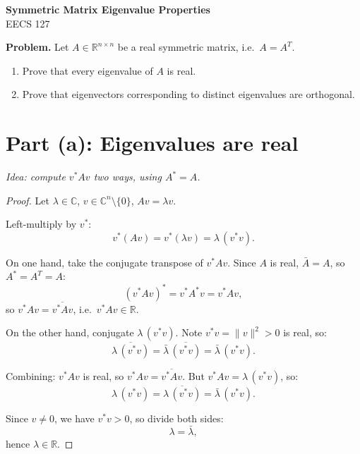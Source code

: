 \documentclass[11pt]{article}
\theoremstyle{definition}
\theoremstyle{plain}
\theoremstyle{remark}
\begin{document}
\begin{center}
  {\Huge \textbf{Symmetric Matrix Eigenvalue Properties}} \\[12pt]
  {\Large EECS 127} \\[24pt]
\end{center}

\vspace{10pt}

\begin{axiombox}
\textbf{Problem.} \; Let $A \in \mathbb{R}^{n \times n}$ be a real symmetric matrix, i.e.\ $A = A^T$.

\begin{enumerate}[label=(\alph*), itemsep=6pt]
  \item Prove that every eigenvalue of $A$ is real.
  \item Prove that eigenvectors corresponding to distinct eigenvalues are orthogonal.
\end{enumerate}
\end{axiombox}

\vspace{20pt}

\section*{Part (a): Eigenvalues are real}

\emph{Idea: compute $v^*Av$ two ways, using $A^* = A$.}

\begin{proof}
Let $\lambda \in \mathbb{C}$, $v \in \mathbb{C}^n \setminus \{0\}$, $Av = \lambda v$.

Left-multiply by $v^*$:
\[
  v^* (Av) = v^* (\lambda v) = \lambda \, (v^* v).
\]

On one hand, take the conjugate transpose of $v^* A v$. Since $A$ is real, $\bar{A} = A$, so $A^* = A^T = A$:
\[
  (v^* A v)^* = v^* A^* v = v^* A v,
\]
so $v^* A v = \overline{v^* A v}$, i.e.\ $v^* A v \in \mathbb{R}$.

On the other hand, conjugate $\lambda\,(v^*v)$. Note $v^* v = \|v\|^2 > 0$ is real, so:
\[
  \overline{\lambda \, (v^* v)} = \bar\lambda \, \overline{(v^* v)} = \bar\lambda \, (v^* v).
\]

Combining: $v^* A v$ is real, so $v^* A v = \overline{v^* A v}$. But $v^* A v = \lambda\,(v^*v)$, so:
\[
  \lambda \, (v^* v) = \overline{\lambda \, (v^* v)} = \bar\lambda \, (v^* v).
\]

Since $v \neq 0$, we have $v^* v > 0$, so divide both sides:
\[
  \boxed{\lambda = \bar\lambda,}
\]
hence $\lambda \in \mathbb{R}$. \qedhere
\end{proof}
\end{document}
